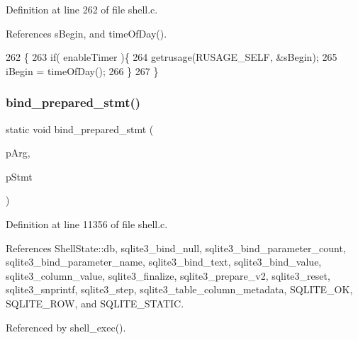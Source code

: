 Definition at line 262 of file shell.\+c.



References s\+Begin, and time\+Of\+Day().


\begin{DoxyCode}
262                             \{
263   \textcolor{keywordflow}{if}( enableTimer )\{
264     getrusage(RUSAGE\_SELF, &sBegin);
265     iBegin = timeOfDay();
266   \}
267 \}
\end{DoxyCode}
\mbox{\label{shell_8c_a54910a6637621adcf6607470f92f8425}} 
\subsubsection{bind\+\_\+prepared\+\_\+stmt()}
{\footnotesize\ttfamily static void bind\+\_\+prepared\+\_\+stmt (\begin{DoxyParamCaption}\item[{\textbf{ Shell\+State} $\ast$}]{p\+Arg,  }\item[{\textbf{ sqlite3\+\_\+stmt} $\ast$}]{p\+Stmt }\end{DoxyParamCaption})\hspace{0.3cm}{\ttfamily [static]}}



Definition at line 11356 of file shell.\+c.



References Shell\+State\+::db, sqlite3\+\_\+bind\+\_\+null, sqlite3\+\_\+bind\+\_\+parameter\+\_\+count, sqlite3\+\_\+bind\+\_\+parameter\+\_\+name, sqlite3\+\_\+bind\+\_\+text, sqlite3\+\_\+bind\+\_\+value, sqlite3\+\_\+column\+\_\+value, sqlite3\+\_\+finalize, sqlite3\+\_\+prepare\+\_\+v2, sqlite3\+\_\+reset, sqlite3\+\_\+snprintf, sqlite3\+\_\+step, sqlite3\+\_\+table\+\_\+column\+\_\+metadata, S\+Q\+L\+I\+T\+E\+\_\+\+OK, S\+Q\+L\+I\+T\+E\+\_\+\+R\+OW, and S\+Q\+L\+I\+T\+E\+\_\+\+S\+T\+A\+T\+IC.



Referenced by shell\+\_\+exec().


